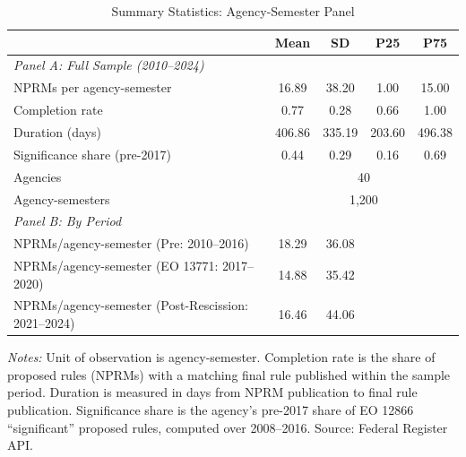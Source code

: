 \begin{table}[htbp]
\centering
\caption{Summary Statistics: Agency-Semester Panel}
\label{tab:summary}
\begin{threeparttable}
\begin{tabular}{lcccc}
\toprule
 & Mean & SD & P25 & P75 \\
\midrule
\multicolumn{5}{l}{\textit{Panel A: Full Sample (2010--2024)}} \\
NPRMs per agency-semester & 16.89 & 38.20 & 1.00 & 15.00 \\
Completion rate & 0.77 & 0.28 & 0.66 & 1.00 \\
Duration (days) & 406.86 & 335.19 & 203.60 & 496.38 \\
Significance share (pre-2017) & 0.44 & 0.29 & 0.16 & 0.69 \\
Agencies & \multicolumn{4}{c}{40} \\
Agency-semesters & \multicolumn{4}{c}{1,200} \\
\midrule
\multicolumn{5}{l}{\textit{Panel B: By Period}} \\
NPRMs/agency-semester (Pre: 2010--2016) & 18.29 & 36.08 & & \\
NPRMs/agency-semester (EO 13771: 2017--2020) & 14.88 & 35.42 & & \\
NPRMs/agency-semester (Post-Rescission: 2021--2024) & 16.46 & 44.06 & & \\
\bottomrule
\end{tabular}
\begin{tablenotes}[flushleft]\footnotesize
\item \textit{Notes:} Unit of observation is agency-semester. Completion rate is the share of proposed rules (NPRMs) with a matching final rule published within the sample period. Duration is measured in days from NPRM publication to final rule publication. Significance share is the agency's pre-2017 share of EO 12866 ``significant'' proposed rules, computed over 2008--2016. Source: Federal Register API.
\end{tablenotes}
\end{threeparttable}
\end{table}

